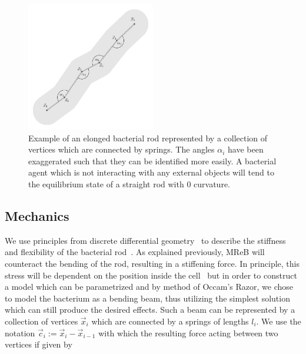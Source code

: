\documentclass{article}
\begin{document}

\begin{figure}
    \centering
    \includegraphics[width=0.5\textwidth]{docs/source/_static/mechanics.png}
    \caption{
        Example of an elonged bacterial rod represented by a collection of vertices which are
        connected by springs.
        The angles $\alpha_i$ have been exaggerated such that they can be identified more easily.
        A bacterial agent which is not interacting with any external objects will tend to the
        equilibrium state of a straight rod with $0$ curvature.
    }
    \label{fig:mechanics-bacterium}
\end{figure}

\subsection{Mechanics}
\label{subsection:mechanical-model-mechanics}

We use principles from discrete differential geometry~\cite{bobenko2008discrete} to describe the
stiffness and flexibility of the bacterial rod~\cite{Amir2014_2}.
As explained previously, MReB will counteract the bending of the rod, resulting in a stiffening
force.
In principle, this stress will be dependent on the position inside the cell~\cite{Chatterjee1988}
but in order to construct a model which can be parametrized and by method of Occam's Razor, we chose
to model the bacterium as a bending beam, thus utilizing the simplest solution which can still
produce the desired effects.
Such a beam can be represented by a collection of vertices $\vec{x}_i$ which are connected by a
springs of lengths $l_i$.
We use the notation $\vec{c}_i:=\vec{x}_i-\vec{x}_{i-1}$ with which the resulting force acting
between two vertices if given by
\end{document}
